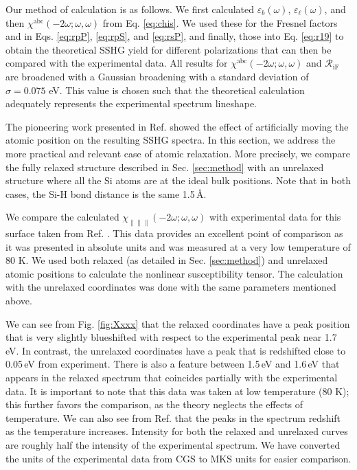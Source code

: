 \documentclass[11pt]{book}
\begin{document}
Our method of calculation is as follows. We first calculated
$\varepsilon_{b}(\omega)$, $\varepsilon_{\ell}(\omega)$, and then
$\chi^{\mathrm{abc}}(-2\omega;\omega,\omega)$ from Eq. \eqref{eq:chis}. We used
these for the Fresnel factors and in Eqs. \eqref{eq:rpP}, \eqref{eq:rpS}, and
\eqref{eq:rsP}, and finally, those into Eq. \eqref{eq:r19} to obtain the
theoretical SSHG yield for different polarizations that can then be compared
with the experimental data. All results for
$\chi^{\mathrm{abc}}(-2\omega;\omega,\omega)$ and ${\mathcal R_{\mathrm{iF}}}$
are broadened with a Gaussian broadening with a standard deviation of
$\sigma=0.075$ eV. This value is chosen such that the theoretical calculation
adequately represents the experimental spectrum lineshape.

The pioneering work presented in Ref. \cite{mejiaPRB02} showed the effect
of artificially moving the atomic position on the resulting SSHG spectra. In
this section, we address the more practical and relevant case of atomic
relaxation. More precisely, we compare the fully relaxed structure described in
Sec. \ref{sec:method} with an unrelaxed structure where all the Si atoms are at
the ideal bulk positions. Note that in both cases, the Si-H bond distance is the
same 1.5\,\AA.

We compare the calculated
$\chi_{\parallel\parallel\parallel}(-2\omega;\omega,\omega)$ with experimental
data for this surface taken from Ref. \cite{hoferAPA96}. This data
provides an excellent point of comparison as it was presented in absolute units
and was measured at a very low temperature of 80 K. We used both relaxed (as
detailed in Sec. \ref{sec:method}) and unrelaxed atomic positions to calculate
the nonlinear susceptibility tensor. The calculation with the unrelaxed
coordinates was done with the same parameters mentioned above.

We can see from Fig. \ref{fig:Xxxx} that the relaxed coordinates have a peak
position that is very slightly blueshifted with respect to the experimental peak
near 1.7\,eV. In contrast, the unrelaxed coordinates have a peak that is
redshifted close to 0.05\,eV from experiment. There is also a feature between
1.5\,eV and 1.6\,eV that appears in the relaxed spectrum that coincides
partially with the experimental data. It is important to note that this data was
taken at low temperature (80 K); this further favors the comparison, as the
theory neglects the effects of temperature. We can also see from Ref.
\cite{hoferAPA96} that the peaks in the spectrum redshift as the
temperature increases. Intensity for both the relaxed and unrelaxed curves are
roughly half the intensity of the experimental spectrum. We have converted the
units of the experimental data from CGS to MKS units for easier comparison.
\end{document}
